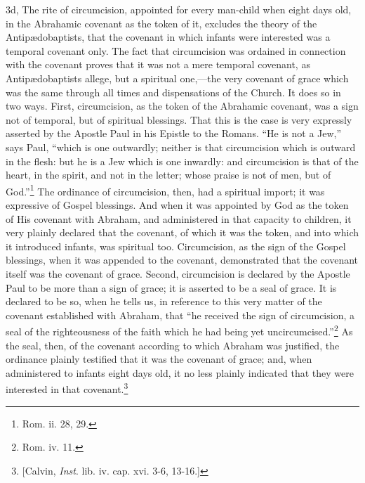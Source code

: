 \documentclass[]{book}
\begin{document}
3d, The rite of circumcision, appointed for every man-child when eight days old, in the Abrahamic covenant as the token of it, excludes the theory of the Antipædobaptists, that the covenant in which infants were interested was a temporal covenant only. The fact that circumcision was ordained in connection with the covenant proves that it was not a mere temporal covenant, as Antipædobaptists allege, but a spiritual one,---the very covenant of grace which was the same through all times and dispensations of the Church. It does so in two ways. First, circumcision, as the token of the Abrahamic covenant, was a sign not of temporal, but of spiritual blessings. That this is the case is very expressly asserted by the Apostle Paul in his Epistle to the Romans. ``He is not a Jew,'' says Paul, ``which is one outwardly; neither is that circumcision which is outward in the flesh: but he is a Jew which is one inwardly: and circumcision is that of the heart, in the spirit, and not in the letter; whose praise is not of men, but of God.''\footnote{Rom. ii. 28, 29.} The ordinance of circumcision, then, had a spiritual import; it was expressive of Gospel blessings. And when it was appointed by God as the token of His covenant with Abraham, and administered in that capacity to children, it very plainly declared that the covenant, of which it was the token, and into which it introduced infants, was spiritual too. Circumcision, as the sign of the Gospel blessings, when it was appended to the covenant, demonstrated that the covenant itself was the covenant of grace. Second, circumcision is declared by the Apostle Paul to be more than a sign of grace; it is asserted to be a seal of grace. It is declared to be so, when he tells us, in reference to this very matter of the covenant established with Abraham, that ``he received the sign of circumcision, a seal of the righteousness of the faith which he had being yet uncircumcised.''\footnote{Rom. iv. 11.} As the seal, then, of the covenant according to which Abraham was justified, the ordinance plainly testified that it was the covenant of grace; and, when administered to infants eight days old, it no less plainly indicated that they were interested in that covenant.\footnote{{[}Calvin, \emph{Inst}. lib. iv. cap. xvi. 3-6, 13-16.{]}}
\end{document}
